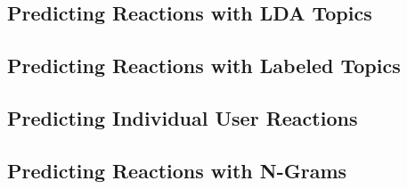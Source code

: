 
\subsection{Predicting Reactions with LDA Topics}


\subsection{Predicting Reactions with Labeled Topics}


\subsection{Predicting Individual User Reactions}


\subsection{Predicting Reactions with N-Grams}

